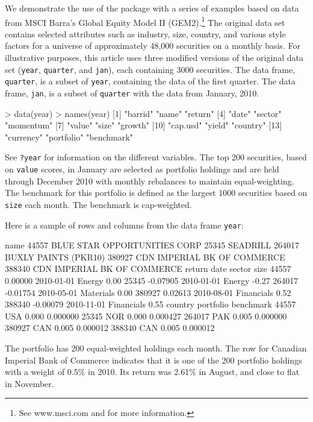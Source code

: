 We demonstrate the use of the  package with a series of
examples based on data from MSCI Barra's Global Equity Model II
(GEM2).\footnote{See www.msci.com and \citet{gem2} for more
  information.} The original data set contains selected attributes
such as industry, size, country, and various style factors for a
universe of approximately 48,000 securities on a monthly basis. For
illustrative purposes, this article uses three modified versions of
the original data set (\texttt{year}, \texttt{quarter}, and
\texttt{jan}), each containing 3000 securities.  The data frame,
\texttt{quarter}, is a subset of \texttt{year}, containing the data of
the first quarter. The data frame, \texttt{jan}, is a subset of
\texttt{quarter} with the data from January, 2010.
\begin{smallverbatim}
> data(year)
> names(year)
 [1] "barrid"    "name"      "return"   
 [4] "date"      "sector"    "momentum" 
 [7] "value"     "size"      "growth"   
[10] "cap.usd"   "yield"     "country"  
[13] "currency"  "portfolio" "benchmark"
\end{smallverbatim}

See \texttt{?year} for information on the different variables. 
The top 200 securities, based on \texttt{value} scores,
  in January are selected as portfolio holdings and are held through
  December 2010 with monthly rebalances to maintain equal-weighting.
  The benchmark for this portfolio is defined as the largest 1000 
  securities based on \texttt{size} each month. The
  benchmark is cap-weighted.

Here is a sample of rows and columns from the data frame
\texttt{year}:
\begin{smallverbatim}
                                      name
44557  BLUE STAR OPPORTUNITIES CORP       
25345  SEADRILL                           
264017 BUXLY PAINTS (PKR10)               
380927 CDN IMPERIAL BK OF COMMERCE        
388340 CDN IMPERIAL BK OF COMMERCE        
         return       date     sector  size
44557   0.00000 2010-01-01     Energy  0.00
25345  -0.07905 2010-01-01     Energy -0.27
264017 -0.01754 2010-05-01  Materials  0.00
380927  0.02613 2010-08-01 Financials  0.52
388340 -0.00079 2010-11-01 Financials  0.55
       country portfolio benchmark
44557      USA     0.000  0.000000
25345      NOR     0.000  0.000427
264017     PAK     0.005  0.000000
380927     CAN     0.005  0.000012
388340     CAN     0.005  0.000012
\end{smallverbatim}

The portfolio has 200 equal-weighted holdings each month. The row 
for Canadian Imperial Bank of Commerce indicates that it is one of the 200
portfolio holdings with a weight of 0.5\% in 2010. Its return was
2.61\% in August, and close to flat in November.

